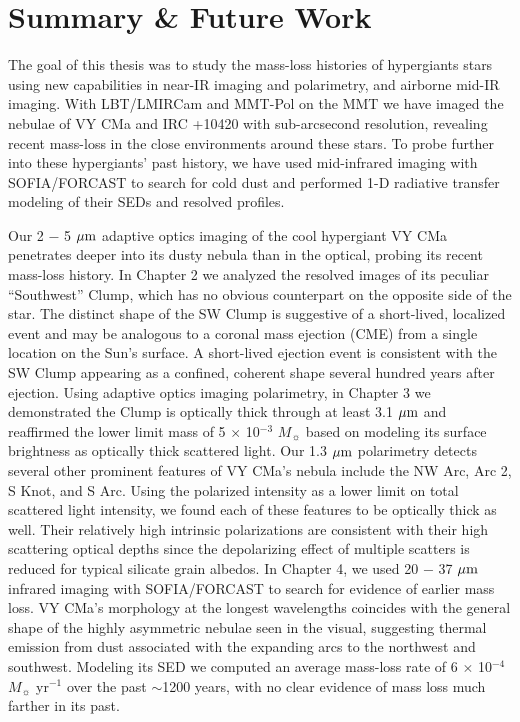 \chapter{Summary \& Future Work}
\label{summary_chapter}

The goal of this thesis was to study the mass-loss histories of hypergiants stars using new capabilities in near-IR imaging and polarimetry, and airborne mid-IR imaging.  With LBT/LMIRCam and MMT-Pol on the MMT we have imaged the nebulae of VY CMa and IRC +10420 with sub-arcsecond resolution, revealing recent mass-loss in the close environments around these stars.  To probe further into these hypergiants' past history, we have used mid-infrared imaging with SOFIA/FORCAST to search for cold dust and performed 1-D radiative transfer modeling of their SEDs and resolved profiles.

Our 2 $-$ 5 $\mbox{$\mu$m}$ adaptive optics imaging of the cool hypergiant VY CMa penetrates deeper into its dusty nebula than in the optical, probing its recent mass-loss history.  In Chapter 2 we analyzed the resolved images of its peculiar ``Southwest'' Clump, which has no obvious counterpart on the opposite side of the star.   The distinct shape of the SW Clump is suggestive of a short-lived, localized event and may be analogous to a coronal mass ejection (CME) from a single location on the Sun's surface.  A short-lived ejection event is consistent with the SW Clump appearing as a confined, coherent shape several hundred years after ejection.  Using adaptive optics imaging polarimetry, in Chapter 3 we demonstrated the Clump is optically thick through at least 3.1 $\mbox{$\mu$m}$ and reaffirmed the lower limit mass of 5 $\times$ 10$^{-3}$ $M_{\sun}$ based on modeling its surface brightness as optically thick scattered light.  Our 1.3 $\mbox{$\mu$m}$ polarimetry detects several other prominent features of VY CMa's nebula include the NW Arc, Arc 2, S Knot, and S Arc.  Using the polarized intensity as a lower limit on total scattered light intensity, we found each of these features to be optically thick as well.  Their relatively high intrinsic polarizations are consistent with their high scattering optical depths since the depolarizing effect of multiple scatters is reduced for typical silicate grain albedos.  In Chapter 4, we used 20 $-$ 37 $
\mbox{$\mu$m}$ infrared imaging with SOFIA/FORCAST to search for evidence of earlier mass loss.  VY CMa's morphology at the longest wavelengths coincides with the general shape of the highly asymmetric nebulae seen in the visual, suggesting thermal emission from dust associated with the expanding arcs to the northwest and southwest.  Modeling its SED we computed an average mass-loss rate of 6 $\times$ 10$^{-4}$ $M_{\sun}$ yr$^{-1}$ over the past $\sim$1200 years, with no clear evidence of mass loss much farther in its past.

